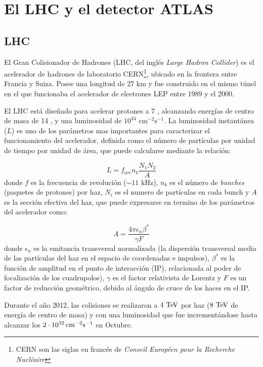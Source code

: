 \chapter{El LHC y el detector ATLAS}

\section{LHC}

El Gran Colisionador de Hadrones (LHC, del inglés \emph{Large Hadron Collider}) es el
acelerador de hadrones de laboratorio CERN\footnote{CERN son las
  siglas en francés de \emph{Conseil Européen pour la Recherche Nucléaire}}, ubicado en
la frontera entre Francia y Suiza. Posee una longitud de 27 km y fue construido
en el mismo túnel en el que funcionaba el acelerador de electrones LEP entre
1989 y el 2000.

El LHC está diseñado para acelerar protones a 7 \tev, alcanzando energías de
centro de masa de 14 \tev, y una luminosidad de $10^{34}$ cm$^{-2}$s$^{-1}$. La luminosidad
instantánea ($L$) es uno de los parámetros mas importantes para caracterizar el funcionamiento del
acelerador, definida como el número de
partículas por unidad de tiempo por unidad de área, que puede calcularse
mediante la relación:

\begin{equation}
  L = f_\text{rev} n_b \frac{N_1 N_2}{A}
\end{equation}
%
donde $f$ es la frecuencia de revolución ($\sim 11$ kHz), $n_b$ es el número de
\emph{bunches} (paquetes de protones) por haz, $N_i$ es el numero de partículas
en cada bunch y $A$ es la sección efectiva del haz, que puede expresarse en
termino de los parámetros del acelerador como:

\begin{equation}
  A = \frac{4\pi \epsilon_n \beta^{*}}{\gamma F}
\end{equation}
%
donde $\epsilon_n$ es la emitancia transversal normalizada (la dispersión
transversal media de las partículas del haz en el espacio de coordenadas e
impulsos), $\beta^{*}$ es la función de amplitud en el punto de interacción
(IP), relacionada al poder de focalización de los cuadrupolos), $\gamma$ es el
factor relativista de Lorentz y $F$ es un factor de reducción geométrico, debido
al ángulo de cruce de los haces en el IP.


Durante el año 2012, las colisiones se realizaron a $4\TeV$ por haz ($8 \TeV$ de
energía de centro de masa) y con una luminosidad que fue incrementándose hasta
alcanzar los $\unit[2 \cdot 10^{32}]{cm^{-2}s^{-1}}$ en Octubre. %

